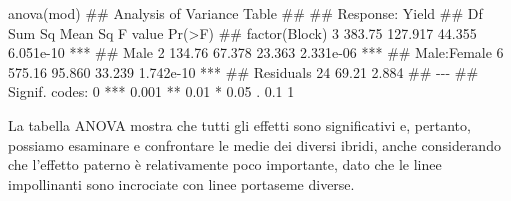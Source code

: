 \documentclass[a4paper,12pt,oneside]{book}
\newenvironment{Shaded}{\begin{snugshade}}{\end{snugshade}}
\newcommand{\DocumentationTok}[1]{#1}
\newcommand{\FunctionTok}[1]{#1}
\newcommand{\NormalTok}[1]{#1}
\begin{document}
\begin{Shaded}
\begin{Highlighting}[]
\FunctionTok{anova}\NormalTok{(mod)}
\DocumentationTok{\#\# Analysis of Variance Table}
\DocumentationTok{\#\# }
\DocumentationTok{\#\# Response: Yield}
\DocumentationTok{\#\#               Df Sum Sq Mean Sq F value    Pr(\textgreater{}F)    }
\DocumentationTok{\#\# factor(Block)  3 383.75 127.917  44.355 6.051e{-}10 ***}
\DocumentationTok{\#\# Male           2 134.76  67.378  23.363 2.331e{-}06 ***}
\DocumentationTok{\#\# Male:Female    6 575.16  95.860  33.239 1.742e{-}10 ***}
\DocumentationTok{\#\# Residuals     24  69.21   2.884                      }
\DocumentationTok{\#\# {-}{-}{-}}
\DocumentationTok{\#\# Signif. codes:  0 \textquotesingle{}***\textquotesingle{} 0.001 \textquotesingle{}**\textquotesingle{} 0.01 \textquotesingle{}*\textquotesingle{} 0.05 \textquotesingle{}.\textquotesingle{} 0.1 \textquotesingle{} \textquotesingle{} 1}
\end{Highlighting}
\end{Shaded}

La tabella ANOVA mostra che tutti gli effetti sono significativi e, pertanto, possiamo esaminare e confrontare le medie dei diversi ibridi, anche considerando che l'effetto paterno è relativamente poco importante, dato che le linee impollinanti sono incrociate con linee portaseme diverse.
\end{document}
